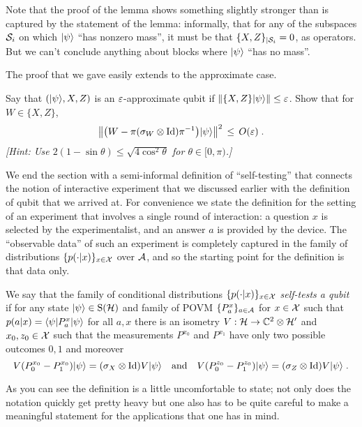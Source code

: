 Note that the proof of the lemma shows something slightly stronger than is captured by the statement of the lemma: informally, that for any of the subspaces $\mathcal{S}_i$ on which $|\psi\rangle$ ``has nonzero mass'', it must be that $\{X,Z\}_{|\mathcal{S}_i}=0$, as operators. But we can't conclude anything about blocks where $|\psi\rangle$ ``has no mass''. 

The proof that we gave easily extends to the approximate case. 

\begin{exercise}
Say that $(|\psi\rangle,X,Z)$ is an $\varepsilon$-approximate qubit if $\|\{X,Z\}|\psi\rangle\|\leq \varepsilon$. Show that for $W\in \{X,Z\}$, 
\[ \big\|\big( W - \pi (\sigma_W \otimes \mathop{\rm Id}\nolimits )\pi^{-1} \big)|\psi\rangle\big\|^2 \,\leq\, O({\varepsilon})\;.\] 
\emph{[Hint: Use $2(1-\sin\theta) \leq \sqrt{4\cos^2\theta}$ for $\theta\in[0,\pi)$.]}
\end{exercise}

We end the section with a semi-informal definition of ``self-testing'' that connects the notion of interactive experiment that we discussed earlier with the definition of qubit that we arrived at. For convenience we state the definition for the setting of an experiment that involves a single round of interaction: a question $x$ is selected by the experimentalist, and an answer $a$ is provided by the device. The ``observable data'' of such an experiment is completely captured in the family of distributions $\{p(\cdot|x)\}_{x\in \mathcal{X}}$ over $\mathcal{A}$, and so the starting point for the definition is that data only. 

\begin{definition}\label{def:self-test}
We say that the family of conditional distributions $\{p(\cdot|x)\}_{x\in \mathcal{X}}$ \emph{self-tests a qubit} if for any state $|\psi\rangle\in \mathrm{S}(\mathcal{H})$ and  family of POVM $\{ P^x_a \}_{a\in \mathcal{A}}$ for $x\in \mathcal{X}$ such that $p(a|x) = \langle\psi| P^x_a |\psi\rangle$ for all $a,x$ there is an isometry $V: \mathcal{H}\to \mathbb{C}^2 \otimes \mathcal{H}'$ and $x_0,z_0 \in \mathcal{X}$ such that the measurements $P^{x_0}$ and $P^{x_1}$ have only two possible outcomes $0,1$ and moreover
\begin{equation}\label{eq:st-1} V ( P^{x_0}_0 - P^{x_0}_1 ) |\psi\rangle = (\sigma_X \otimes \mathop{\rm Id}\nolimits )V |\psi\rangle\quad\text{and}\quad V ( P^{z_0}_0 - P^{z_0}_1 ) |\psi\rangle = (\sigma_Z \otimes \mathop{\rm Id}\nolimits )V |\psi\rangle \;.
\end{equation}
\end{definition}

As you can see the definition is a little uncomfortable to state; not only does the notation quickly get pretty heavy but one also has to be quite careful to make a meaningful statement for the applications that one has in mind.

